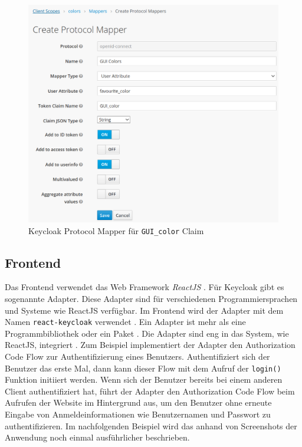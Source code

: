\begin{figure}[!ht]
	\centering
	\includegraphics[width=1\textwidth]{Images/EbertScherer/KeycloakNewClaimProtocolMapper.PNG}
	\caption{Keycloak Protocol Mapper für \texttt{GUI\_color} Claim}
	\label{fig:EB_Keycloak Protocol Mapper fuer GUI color Claim}
\end{figure}



\subsection{Frontend}

Das Frontend verwendet das Web Framework \textit{ReactJS} \cite{EB43}. Für Keycloak gibt es sogenannte Adapter. Diese Adapter sind für verschiedenen Programmiersprachen und Systeme wie ReactJS verfügbar. Im Frontend wird der Adapter mit dem Namen \texttt{react-keycloak} verwendet \cite{EB36}. Ein Adapter ist mehr als eine Programmbibliothek oder ein Paket \cite{EB43}. Die Adapter sind eng in das System, wie ReactJS, integriert \cite{EB43}. Zum Beispiel implementiert der Adapter den Authorization Code Flow zur Authentifizierung eines Benutzers. Authentifiziert sich der Benutzer das erste Mal, dann kann dieser Flow mit dem Aufruf der \texttt{login()} Funktion initiiert werden. Wenn sich der Benutzer bereits bei einem anderen Client authentifiziert hat, führt der Adapter den Authorization Code Flow beim Aufrufen der Website im Hintergrund aus, um den Benutzer ohne erneute Eingabe von Anmeldeinformationen wie Benutzernamen und Passwort zu authentifizieren. Im nachfolgenden Beispiel wird das anhand von Screenshots der Anwendung noch einmal ausführlicher beschrieben.

